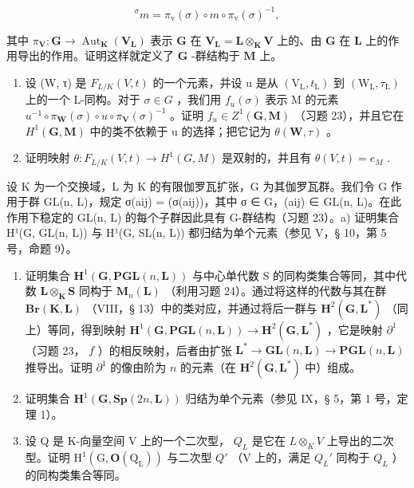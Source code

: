 \[
{ } ^ { \sigma } m = \pi _ { \mathrm{v} } ( \sigma ) \circ m \circ \pi _ { \mathrm{v} } ( \sigma ) ^ { - 1 } ,
\]

其中 \(\pi_{\mathbf{V}}: \mathbf{G} \to \operatorname{Aut}_{\mathbf{K}}(\mathbf{V}_{\mathbf{L}})\) 表示 \(\mathbf{G}\) 在 \(\mathbf{V}_{\mathbf{L}} = \mathbf{L} \otimes_{\mathbf{K}} \mathbf{V}\) 上的、由 \(\mathbf{G}\) 在 \(\mathbf{L}\) 上的作用导出的作用。证明这样就定义了 \(\mathbf{G}\) -群结构于 \(\mathbf{M}\) 上。

\begin{enumerate}
\def\labelenumi{\alph{enumi})}
\setcounter{enumi}{1}
\item
  设 (W, τ) 是 \(F_{L/K}(V, t)\) 的一个元素，并设 u 是从 \((\mathrm{V}_{\mathrm{L}}, t_{\mathrm{L}})\) 到 \((\mathrm{W}_{\mathrm{L}}, \tau_{\mathrm{L}})\) 上的一个 L-同构。对于 \(\sigma \in G\) ，我们用 \(f_{u}(\sigma)\) 表示 M 的元素 \(u^{-1} \circ \pi_{\mathbf{W}}(\sigma) \circ u \circ \pi_{\mathbf{V}}(\sigma)^{-1}\) 。证明 \(f_{u} \in Z^{1}(\mathbf{G}, \mathbf{M})\) （习题 23），并且它在 \(H^{1}(\mathbf{G}, \mathbf{M})\) 中的类不依赖于 u 的选择；把它记为 \(\theta(\mathbf{W}, \tau)\) 。
\item
  证明映射 \(\theta : F_{L/K}(V, t) \to H^1(G, M)\) 是双射的，并且有 \(\theta(V, t) = e_M\) .
\end{enumerate}

设 K 为一个交换域，L 为 K 的有限伽罗瓦扩张，G 为其伽罗瓦群。我们令 G 作用于群 GL(n, L)，规定 σ(aij) = (σ(aij))，其中 σ ∈ G，(aij) ∈ GL(n, L)。在此作用下稳定的 GL(n, L) 的每个子群因此具有 G-群结构（习题 23）。a) 证明集合 H¹(G, GL(n, L)) 与 H¹(G, SL(n, L)) 都归结为单个元素（参见 V，§ 10，第 5 号，命题 9）。

\begin{enumerate}
\def\labelenumi{\alph{enumi})}
\setcounter{enumi}{1}
\item
  证明集合 \(\mathbf{H}^{1}(\mathbf{G},\mathbf{PGL}(n,\mathbf{L}))\) 与中心单代数 S 的同构类集合等同，其中代数 \(\mathbf{L}\otimes_{\mathbf{K}}\mathbf{S}\) 同构于 \(\mathbf{M}_{n}(\mathbf{L})\) （利用习题 24）。通过将这样的代数与其在群 \(\mathbf{Br}(\mathbf{K},\mathbf{L})\) （VIII，§ 13）中的类对应，并通过将后一群与 \(\mathbf{H}^{2}(\mathbf{G},\mathbf{L}^{*})\) （同上）等同，得到映射 \(\mathbf{H}^{1}(\mathbf{G},\mathbf{PGL}(n,\mathbf{L}))\to \mathbf{H}^{2}(\mathbf{G},\mathbf{L}^{*})\) ，它是映射 \(\partial^{1}\) （习题 23， \(f\) ）的相反映射，后者由扩张 \(\mathbf{L}^{*}\to \mathbf{GL}(n,\mathbf{L})\to \mathbf{PGL}(n,\mathbf{L})\) 推导出。证明 \(\partial^{1}\) 的像由阶为 \(n\) 的元素（在 \(\mathbf{H}^{2}(\mathbf{G},\mathbf{L}^{*})\) 中）组成。
\item
  证明集合 \(\mathbf{H}^{1}(\mathbf{G},\mathbf{Sp}(2n,\mathbf{L}))\) 归结为单个元素（参见 IX，§ 5，第 1 号，定理 1）。
\item
  设 Q 是 K-向量空间 V 上的一个二次型， \(Q_{L}\) 是它在 \(L \otimes_{K} V\) 上导出的二次型。证明 \(\mathrm{H}^{1}(\mathrm{G}, \mathbf{O}(\mathrm{Q}_{\mathrm{L}}))\) 与二次型 \(Q'\) （V 上的，满足 \(Q_{L}'\) 同构于 \(Q_{L}\) ）的同构类集合等同。
\end{enumerate}


